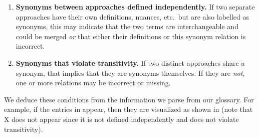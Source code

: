 \begin{enumerate}

    \item%
          \textbf{Synonyms between approaches defined independently.}\hfill\break
          If two separate approaches have their own definitions, nuances,
          etc.~but are also labelled as synonyms, this may indicate that the
          two terms are interchangeable and could be merged \emph{or} that
          either their definitions or this synonym relation is incorrect.

    \item%
          \textbf{Synonyms that violate transitivity.}\hfill\break
          If two distinct approaches share a synonym, that implies that they
          are synonyms themselves. If they are \emph{not}, one or more
          relations may be incorrect or missing.
\end{enumerate}
\ifnotpaper
    We deduce these conditions from the information we parse from our glossary.
    For example, if the entries in  appear, then
    they are visualized as shown in  (note that X
    does not appear since it is not defined independently and does not violate
    transitivity).

    
    \ExampleSynGraph{}

